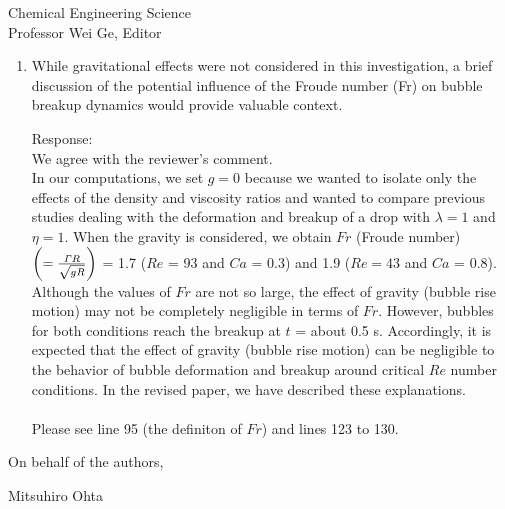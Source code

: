 \documentclass{letter}
\begin{document}
\begin{letter}{
Chemical Engineering Science\\
Professor Wei Ge, Editor\\}
\begin{enumerate}
\par\noindent
\item
\textsf
{While gravitational effects were not considered in this investigation, a brief discussion of the potential influence 
of the Froude number (Fr) on bubble breakup dynamics would provide valuable context.}
\vspace{3 mm}

Response: \\
We agree with the reviewer's comment.  \\
In our computations, we set $g = 0$ because we wanted to isolate only the effects of the density and viscosity ratios and 
wanted to compare previous studies dealing with the deformation and breakup of a drop with $\lambda =1$ and $\eta = 1$.
When the gravity is considered, we obtain $Fr$ (Froude number) $\left(= \frac{{\it \Gamma}R}{\sqrt {gR}} \right)$ = 1.7 ($Re$ = 93 and $Ca$ = 0.3) 
and 1.9 ($Re = 43$ and $Ca$ = 0.8). \\
Although the values of $Fr$ are not so large, the effect of gravity (bubble rise motion) may not be completely negligible in terms of $Fr$.
However, bubbles for both conditions reach the breakup at $t$ = about 0.5 s. 
Accordingly, it is expected that the effect of gravity (bubble rise motion) can be negligible to the behavior of bubble deformation and breakup 
around critical $Re$ number conditions.
In the revised paper, we have described these explanations.\\
\\
Please see line 95 (the definiton of $Fr$) and lines 123 to 130.
\\


\end{enumerate}

\closing{On behalf of the authors,}
Mitsuhiro Ohta

\end{letter}
\end{document}

